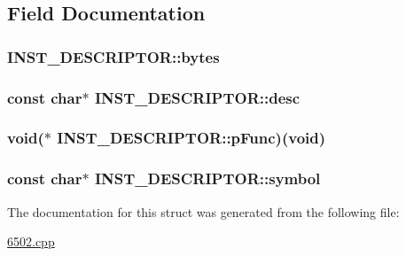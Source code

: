 \subsection{Field Documentation}
\hypertarget{struct_i_n_s_t___d_e_s_c_r_i_p_t_o_r_a03e7d28b32109105758ff0e4ba5c5434}{
\subsubsection[{bytes}]{ {\bf I\-N\-S\-T\-\_\-\-D\-E\-S\-C\-R\-I\-P\-T\-O\-R\-::bytes}}}\label{struct_i_n_s_t___d_e_s_c_r_i_p_t_o_r_a03e7d28b32109105758ff0e4ba5c5434}
\hypertarget{struct_i_n_s_t___d_e_s_c_r_i_p_t_o_r_ab1832944355704705dafef16c6ac98e5}{
\subsubsection[{desc}]{\setlength{\rightskip}{0pt plus 5cm}const char$\ast$ {\bf I\-N\-S\-T\-\_\-\-D\-E\-S\-C\-R\-I\-P\-T\-O\-R\-::desc}}}\label{struct_i_n_s_t___d_e_s_c_r_i_p_t_o_r_ab1832944355704705dafef16c6ac98e5}
\hypertarget{struct_i_n_s_t___d_e_s_c_r_i_p_t_o_r_a0f292185e54563dee359af8a98a8b7f7}{
\subsubsection[{p\-Func}]{\setlength{\rightskip}{0pt plus 5cm}void($\ast$ {\bf I\-N\-S\-T\-\_\-\-D\-E\-S\-C\-R\-I\-P\-T\-O\-R\-::p\-Func})(void)}}\label{struct_i_n_s_t___d_e_s_c_r_i_p_t_o_r_a0f292185e54563dee359af8a98a8b7f7}
\hypertarget{struct_i_n_s_t___d_e_s_c_r_i_p_t_o_r_a59dc8c7d6529d6c482ba826dc393ea97}{
\subsubsection[{symbol}]{\setlength{\rightskip}{0pt plus 5cm}const char$\ast$ {\bf I\-N\-S\-T\-\_\-\-D\-E\-S\-C\-R\-I\-P\-T\-O\-R\-::symbol}}}\label{struct_i_n_s_t___d_e_s_c_r_i_p_t_o_r_a59dc8c7d6529d6c482ba826dc393ea97}


The documentation for this struct was generated from the following file\-:\begin{DoxyCompactItemize}
\item 
\hyperlink{6502_8cpp}{6502.\-cpp}\end{DoxyCompactItemize}
